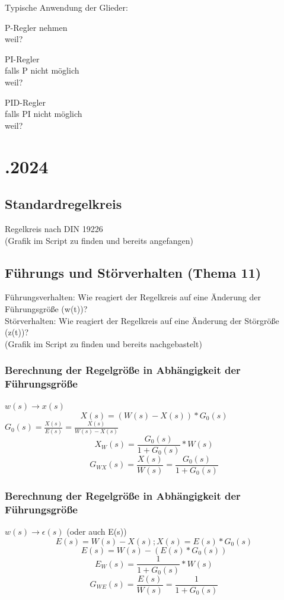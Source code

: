 \documentclass[a4paper, twoside, 11pt]{article}
\begin{document}
Typische Anwendung der Glieder: 
\begin{multicols}{3}
	P-Regler nehmen \\
	weil?

	\columnbreak
	PI-Regler \\
	falls P nicht möglich \\
	weil?

	\columnbreak
	PID-Regler \\
	falls PI nicht möglich \\
	weil?
\end{multicols}


\newpage
\section*{.2024}
\subsection*{Standardregelkreis}
Regelkreis nach DIN 19226 \\
(Grafik im Script zu finden und bereits angefangen)

\subsection*{Führungs und Störverhalten (Thema 11)}
Führungsverhalten: Wie reagiert der Regelkreis auf eine Änderung der Führungsgröße (w(t))? \\
Störverhalten: Wie reagiert der Regelkreis auf eine Änderung der Störgröße (z(t))? \\
(Grafik im Script zu finden und bereits nachgebastelt)

\subsubsection*{Berechnung der Regelgröße in Abhängigkeit der Führungsgröße}
$w(s) \rightarrow x(s)$
\[ X(s)=(W(s)-X(s)) * G_0(s) \]
$G_0(s)=\frac{X(s)}{E(s)} = \frac{X(s)}{W(s)-X(s)}$
\[ X_W(s)=\frac{G_0(s)}{1+G_0(s)} * W(s) \]
\[ G_{WX}(s)=\frac{X(s)}{W(s)} = \frac{G_0(s)}{1+G_0(s)} \]

\subsubsection*{Berechnung der Regelgröße in Abhängigkeit der Führungsgröße}
$w(s) \rightarrow \epsilon(s)$ (oder auch E(s))
\[ E(s)=W(s)-X(s); X(s)=E(s)*G_0(s) \]
\[ E(s)=W(s)-(E(s)*G_0(s)) \]
\[ E_W(s)=\frac{1}{1+G_0(s)}*W(s) \]
\[ G_{WE}(s)=\frac{E(s)}{W(s)}=\frac{1}{1+G_0(s)} \]
\end{document}
